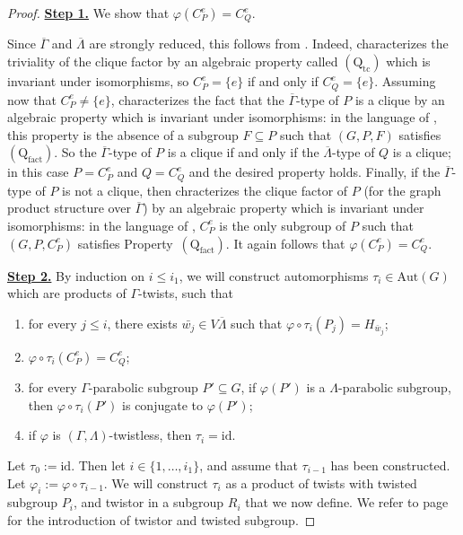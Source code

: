\documentclass[a4paper,english,11pt]{article}
\theoremstyle{definition}
\theoremstyle{remark}
\newcommand{\Aut}{\mathrm{Aut}}
\begin{document}
\begin{proof}
\underline{\textbf{Step 1.}} We show that  $\varphi(C^e_P) = C^e_Q$.
\smallskip

  Since $\overline{\Gamma}$ and $\overline{\Lambda}$ are strongly reduced, this follows from \cite[Lemmas~A.20 and~A.22]{EH}. Indeed, \cite[Lemma~A.22]{EH} characterizes the triviality of the clique factor by an algebraic property called $(\mathrm{Q}_{\mathrm{tc}})$ which is invariant under isomorphisms, so $C_P^e=\{e\}$ if and only if $C_Q^e=\{e\}$. Assuming now that $C_P^e\neq\{e\}$, \cite[Lemma~A.20]{EH} characterizes the fact that the $\overline{\Gamma}$-type of $P$ is a clique by an algebraic property which is invariant under isomorphisms: in the language of \cite{EH}, this property is the absence of a subgroup $F\subseteq P$ such that $(G,P,F)$ satisfies $(\mathrm{Q}_{\mathrm{fact}})$. So the $\overline{\Gamma}$-type of $P$ is a clique if and only if the $\overline{\Lambda}$-type of $Q$ is a clique; in this case $P=C_P^e$ and $Q=C_Q^e$ and the desired property holds. Finally, if the $\overline{\Gamma}$-type of $P$ is not a clique, then \cite[Lemma~A.20]{EH} chracterizes the clique factor of $P$ (for the graph product structure over $\overline{\Gamma}$) by an algebraic property which is invariant under isomorphisms: in the language of \cite[Lemma~A.20]{EH}, $C_P^e$ is the only subgroup of $P$ such that $(G,P,C_P^e)$ satisfies Property~$(\mathrm{Q}_{\mathrm{fact}})$. It again follows that $\varphi(C_P^e)=C_Q^e$.

\medskip

\underline{\textbf{Step 2.}} By induction on $i\le i_1$, we will construct automorphisms $\tau_i\in\Aut(G)$ which are products of $\Gamma$-twists, such that  
\begin{enumerate}
    \item for every $j\le i$, there exists $\bar{w_j}\in V\overline{\Lambda}$ such that $\varphi\circ\tau_i(P_j)=H_{\bar{w}_j}$;
    \item $\varphi\circ\tau_i(C_P^e)=C_Q^e$;
    \item for every $\Gamma$-parabolic subgroup $P'\subseteq G$, if $\varphi(P')$ is a $\Lambda$-parabolic subgroup, then $\varphi\circ\tau_i(P')$ is conjugate to $\varphi(P')$;
    \item if $\varphi$ is $(\Gamma,\Lambda)$-twistless, then $\tau_i=\mathrm{id}$.
\end{enumerate}

\smallskip

Let $\tau_0:=\mathrm{id}$. Then let $i\in\{1,\dots,i_1\}$, and assume that $\tau_{i-1}$ has been constructed. Let $\varphi_i:=\varphi\circ\tau_{i-1}$. We will construct $\tau_i$ as a product of twists with twisted subgroup $P_i$, and twistor in a subgroup $R_i$ that we now define. We refer to page~\pageref{def:twistor} for the introduction of twistor and twisted subgroup.


\end{proof}
\end{document}
